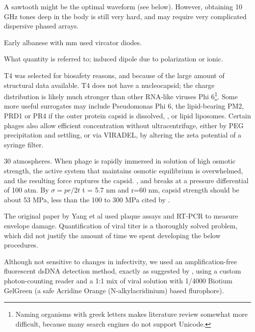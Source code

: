 \documentclass[paper.tex]{subfiles}
\begin{document}
\begin{multicols}{1}
A sawtooth might be the optimal waveform (see below). However, obtaining 10 GHz tones deep in the body is still very hard, and may require very complicated dispersive phased arrays\cite{Microwave1982a}.

Early albanese with mm used vircator diodes. 

What quantity is referred to; induced dipole due to polarization or ionic.

T4 was selected for biosafety reasons, and because of the large amount of structural data available. T4 does not have a nucleocapsid; the charge distribution is likely much stronger than other RNA-like viruses Phi 6\footnote{Naming organisms with greek letters makes literature review somewhat more difficult, because many search engines do not support Unicode.}. Some more useful surrogates may include Pseudomonas Phi 6\cite{Selection2017}, the lipid-bearing PM2, PRD1 or PR4\cite{Lipidcontaining1979} if the outer protein capsid is dissolved\cite{Bacteriophage2002}, \cite{Dissociation1993}, or lipid liposomes. Certain phages also allow efficient concentration without ultracentrifuge, either by PEG precipitation\cite{Rapid1970} and settling, or via VIRADEL\cite{GROWTH}\cite{Chemical1982}\cite{highly1988}\cite{AdsorptionElution1989}, by altering the zeta potential of a syringe filter. 



30 atmospheres. When phage is rapidly immersed in solution of high osmotic strength, the active system that maintains osmotic equilibrium is overwhelmed, and the resulting force ruptures the capsid. \cite{Osmotic2003}, and breaks at a pressure differential of 100 atm. By $\sigma = pr / 2t $ t = 5.7 nm\cite{Head1988} and r=60 nm, capsid strength should be about 53 MPa, less than the 100 to 300 MPa cited by \cite{Bacteriophage2004}.

The original paper by Yang et al used plaque assays and RT-PCR to measure envelope damage. Quantification of viral titer is a thoroughly solved problem, which did not justify the amount of time we spent developing the below procedures.

Although not sensitive to changes in infectivity, we used an amplification-free fluorescent dsDNA detection method, exactly as suggested by \cite{Quantification2020}, using a custom photon-counting reader and a 1:1 mix of viral solution with 1/4000 Biotium GelGreen (a safe Acridine Orange (N-alkylacridinium) based flurophore). 


\end{multicols}
\end{document}
